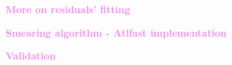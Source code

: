 \documentclass[8pt]{beamer}
\begin{document}
\begin{frame}
  \begin{center}
    {\textcolor{violet}{\LARGE{\bf More on residuals' fitting}}}
  \end{center}
\end{frame}




\begin{frame}
  \begin{center}
    {\textcolor{violet}{\LARGE{\bf Smearing algorithm - Atlfast implementation}}}
  \end{center}
\end{frame}



\begin{frame}
  \begin{center}
    {\textcolor{violet}{\LARGE{\bf Validation}}}
  \end{center}
\end{frame}


\end{document}
